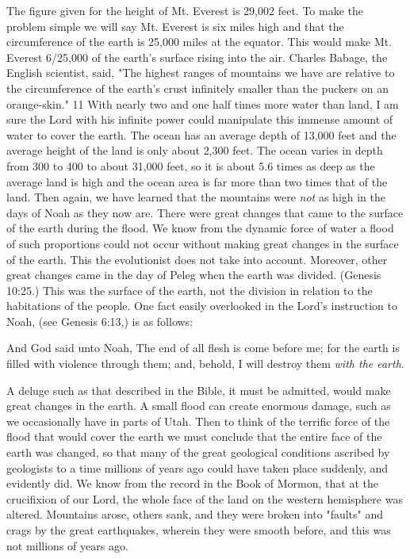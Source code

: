 The figure given for the height of Mt. Everest is 29,002 feet. To make the problem simple we
will say Mt. Everest is six miles high and that the circumference of the earth is 25,000 miles
at the equator. This would make Mt. Everest 6/25,000 of the earth's surface rising into the air.
Charles Babage, the English scientist, said, "The highest ranges of mountains we have are
relative to the circumference of the earth's crust infinitely smaller than the puckers on an
orange-skin." 11 With nearly two and one half times more water than land, I am sure the
Lord with his infinite power could manipulate this immense amount of water to cover the
earth. The ocean has an average depth of 13,000 feet and the average height of the land is
only about 2,300 feet. The ocean varies in depth from 300 to 400 to about 31,000 feet, so it is
about 5.6 times as deep as the average land is high and the ocean area is far more than two
times that of the land. Then again, we have learned that the mountains were \textit{not} as high in the
days of Noah as they now are. There were great changes that came to the surface of the earth
during the flood. We know from the dynamic force of water a flood of such proportions
could not occur without making great changes in the surface of the earth. This the
evolutionist does not take into account. Moreover, other great changes came in the day of
Peleg when the earth was divided. (Genesis 10:25.) This was the surface of the earth, not the
division in relation to the habitations of the people. One fact easily overlooked in the Lord's
instruction to Noah, (see Genesis 6:13,) is as follows:

And God said unto Noah, The end of all flesh is come before me; for the earth is filled with
violence through them; and, behold, I will destroy them \textit{with the earth}.

A deluge such as that described in the Bible, it must be admitted, would make great changes
in the earth. A small flood can create enormous damage, such as we occasionally have in
parts of Utah. Then to think of the terrific force of the flood that would cover the earth we
must conclude that the entire face of the earth was changed, so that many of the great
geological conditions ascribed by geologists to a time millions of years ago could have taken
place suddenly, and evidently did. We know from the record in the Book of Mormon, that at
the crucifixion of our Lord, the whole face of the land on the western hemisphere was
altered. Mountains arose, others sank, and they were broken into "faults" and crags by the
great earthquakes, wherein they were smooth before, and this was not millions of years ago.

